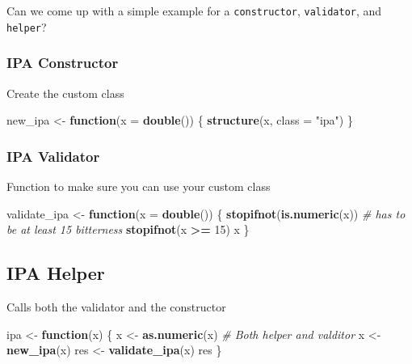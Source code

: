 \documentclass[]{book}
\newenvironment{Shaded}{\begin{snugshade}}{\end{snugshade}}
\newcommand{\CommentTok}[1]{\textcolor[rgb]{0.56,0.35,0.01}{\textit{#1}}}
\newcommand{\ControlFlowTok}[1]{\textcolor[rgb]{0.13,0.29,0.53}{\textbf{#1}}}
\newcommand{\DataTypeTok}[1]{\textcolor[rgb]{0.13,0.29,0.53}{#1}}
\newcommand{\DecValTok}[1]{\textcolor[rgb]{0.00,0.00,0.81}{#1}}
\newcommand{\KeywordTok}[1]{\textcolor[rgb]{0.13,0.29,0.53}{\textbf{#1}}}
\newcommand{\NormalTok}[1]{#1}
\newcommand{\OperatorTok}[1]{\textcolor[rgb]{0.81,0.36,0.00}{\textbf{#1}}}
\newcommand{\StringTok}[1]{\textcolor[rgb]{0.31,0.60,0.02}{#1}}
\begin{document}
Can we come up with a simple example for a \texttt{constructor}, \texttt{validator}, and \texttt{helper}?

\hypertarget{ipa-constructor}{%
\subsubsection*{IPA Constructor}\label{ipa-constructor}}

Create the custom class

\begin{Shaded}
\begin{Highlighting}[]
\NormalTok{new_ipa <-}\StringTok{ }\ControlFlowTok{function}\NormalTok{(}\DataTypeTok{x =} \KeywordTok{double}\NormalTok{()) \{}
  \KeywordTok{structure}\NormalTok{(x, }\DataTypeTok{class =} \StringTok{"ipa"}\NormalTok{)}
\NormalTok{\}}
\end{Highlighting}
\end{Shaded}

\hypertarget{ipa-validator}{%
\subsubsection*{IPA Validator}\label{ipa-validator}}

Function to make sure you can use your custom class

\begin{Shaded}
\begin{Highlighting}[]
\NormalTok{validate_ipa <-}\StringTok{ }\ControlFlowTok{function}\NormalTok{(}\DataTypeTok{x =} \KeywordTok{double}\NormalTok{()) \{}
  \KeywordTok{stopifnot}\NormalTok{(}\KeywordTok{is.numeric}\NormalTok{(x))}
  \CommentTok{# has to be at least 15 bitterness}
  \KeywordTok{stopifnot}\NormalTok{(x }\OperatorTok{>=}\StringTok{ }\DecValTok{15}\NormalTok{)}
\NormalTok{  x}
\NormalTok{\}}
\end{Highlighting}
\end{Shaded}

\hypertarget{ipa-helper}{%
\subsection*{IPA Helper}\label{ipa-helper}}

Calls both the validator and the constructor

\begin{Shaded}
\begin{Highlighting}[]
\NormalTok{ipa <-}\StringTok{ }\ControlFlowTok{function}\NormalTok{(x) \{}
\NormalTok{  x <-}\StringTok{ }\KeywordTok{as.numeric}\NormalTok{(x)}
  \CommentTok{# Both helper and valditor}
\NormalTok{  x <-}\StringTok{ }\KeywordTok{new_ipa}\NormalTok{(x)}
\NormalTok{  res <-}\StringTok{ }\KeywordTok{validate_ipa}\NormalTok{(x)}
\NormalTok{  res}
\NormalTok{\}}
\end{Highlighting}
\end{Shaded}
\end{document}
